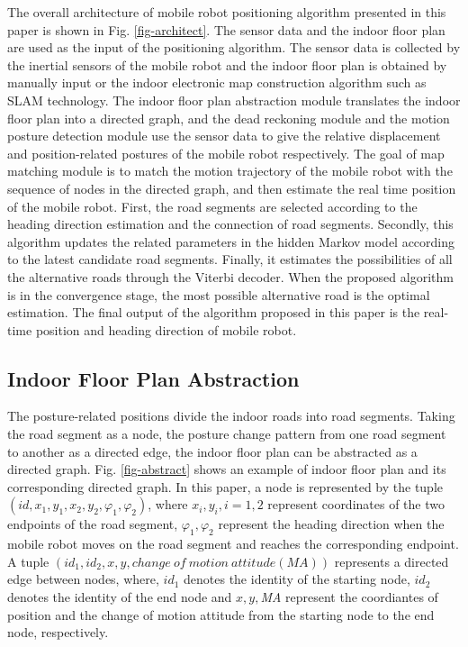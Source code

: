 \documentclass{llncs}
\begin{document}
The overall architecture of mobile robot positioning algorithm presented in this paper is shown in Fig. \ref{fig-architect}. The sensor data and the indoor floor plan are used as the input of the positioning algorithm. The sensor data is collected by the inertial sensors of the mobile robot and the indoor floor plan is obtained by manually input or the indoor electronic map construction algorithm such as SLAM technology. The indoor floor plan abstraction module translates the indoor floor plan into a directed graph, and the dead reckoning module and the motion posture detection module use the sensor data to give the relative displacement and position-related postures of the mobile robot respectively. The goal of map matching module is to match the motion trajectory of the mobile robot with the sequence of nodes in the directed graph, and then estimate the real time position of the mobile robot. First, the road segments are selected according to the heading direction estimation and the connection of road segments. Secondly, this algorithm updates the related parameters in the hidden Markov model according to the latest candidate road segments. Finally, it estimates the possibilities of all the alternative roads through the Viterbi decoder. When the proposed algorithm is in the convergence stage, the most possible alternative road is the optimal estimation. The final output of the algorithm proposed in this paper is the real-time position and heading direction of mobile robot.

\subsection{Indoor Floor Plan Abstraction}

The posture-related positions divide the indoor roads into road segments. Taking the road segment as a node, the posture change pattern from one road segment to another as a directed edge, the indoor floor plan can be abstracted as a directed graph. Fig. \ref{fig-abstract} shows an example of indoor floor plan and its corresponding directed graph. In this paper, a node is represented by the tuple $(id,{x_1},{y_1},{x_2},{y_2},{\varphi _1},{\varphi _2})$, where ${x_i},{y_i},i = 1,2$ represent coordinates of the two endpoints of the road segment, ${\varphi _1},{\varphi _2}$ represent the heading direction when the mobile robot moves on the road segment and reaches the corresponding endpoint. A tuple $(i{d_1},i{d_2},x,y,change\ of\ motion\ attitude(MA))$ represents a directed edge between nodes, where, $i{d_1}$ denotes the identity of the starting node, $i{d_2}$ denotes the identity of the end node and $x,y,$\emph{MA} represent the coordiantes of position and the change of motion attitude from the starting node to the end node, respectively.
\end{document}

